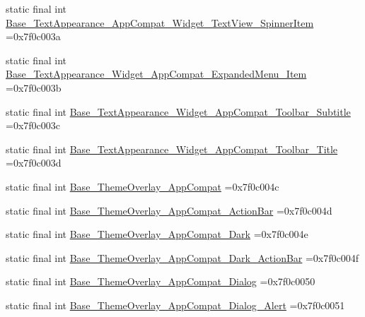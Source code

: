 \begin{DoxyCompactItemize}
\item 
static final int \mbox{\hyperlink{classbr_1_1unb_1_1cic_1_1mp_1_1marketmaster_1_1test_1_1R_1_1style_ac5f47cd9e0ef6367a47dc2f1d971d2ba}{Base\+\_\+\+Text\+Appearance\+\_\+\+App\+Compat\+\_\+\+Widget\+\_\+\+Text\+View\+\_\+\+Spinner\+Item}} =0x7f0c003a
\item 
static final int \mbox{\hyperlink{classbr_1_1unb_1_1cic_1_1mp_1_1marketmaster_1_1test_1_1R_1_1style_aa7fa7f457416be501f5bf094d8d5b4b9}{Base\+\_\+\+Text\+Appearance\+\_\+\+Widget\+\_\+\+App\+Compat\+\_\+\+Expanded\+Menu\+\_\+\+Item}} =0x7f0c003b
\item 
static final int \mbox{\hyperlink{classbr_1_1unb_1_1cic_1_1mp_1_1marketmaster_1_1test_1_1R_1_1style_a79fcc1a1e7d02b4c8cbd3c413540d922}{Base\+\_\+\+Text\+Appearance\+\_\+\+Widget\+\_\+\+App\+Compat\+\_\+\+Toolbar\+\_\+\+Subtitle}} =0x7f0c003c
\item 
static final int \mbox{\hyperlink{classbr_1_1unb_1_1cic_1_1mp_1_1marketmaster_1_1test_1_1R_1_1style_a4c5c4421297e427bdb4a616f03891e45}{Base\+\_\+\+Text\+Appearance\+\_\+\+Widget\+\_\+\+App\+Compat\+\_\+\+Toolbar\+\_\+\+Title}} =0x7f0c003d
\item 
static final int \mbox{\hyperlink{classbr_1_1unb_1_1cic_1_1mp_1_1marketmaster_1_1test_1_1R_1_1style_ac61d8932ba145853b445c490eabec8f8}{Base\+\_\+\+Theme\+Overlay\+\_\+\+App\+Compat}} =0x7f0c004c
\item 
static final int \mbox{\hyperlink{classbr_1_1unb_1_1cic_1_1mp_1_1marketmaster_1_1test_1_1R_1_1style_a3d93a78617519e758deb22ba35261cfb}{Base\+\_\+\+Theme\+Overlay\+\_\+\+App\+Compat\+\_\+\+Action\+Bar}} =0x7f0c004d
\item 
static final int \mbox{\hyperlink{classbr_1_1unb_1_1cic_1_1mp_1_1marketmaster_1_1test_1_1R_1_1style_abd8da30f93bc57ab255fe539bcf9b2e5}{Base\+\_\+\+Theme\+Overlay\+\_\+\+App\+Compat\+\_\+\+Dark}} =0x7f0c004e
\item 
static final int \mbox{\hyperlink{classbr_1_1unb_1_1cic_1_1mp_1_1marketmaster_1_1test_1_1R_1_1style_ab1bac34a3bfd1eea8851cc76b3d89c12}{Base\+\_\+\+Theme\+Overlay\+\_\+\+App\+Compat\+\_\+\+Dark\+\_\+\+Action\+Bar}} =0x7f0c004f
\item 
static final int \mbox{\hyperlink{classbr_1_1unb_1_1cic_1_1mp_1_1marketmaster_1_1test_1_1R_1_1style_a803b6d1fe24017fad52fa90d797b92df}{Base\+\_\+\+Theme\+Overlay\+\_\+\+App\+Compat\+\_\+\+Dialog}} =0x7f0c0050
\item 
static final int \mbox{\hyperlink{classbr_1_1unb_1_1cic_1_1mp_1_1marketmaster_1_1test_1_1R_1_1style_a40e350070ba9c1c2cfc5f3440c6a6d4e}{Base\+\_\+\+Theme\+Overlay\+\_\+\+App\+Compat\+\_\+\+Dialog\+\_\+\+Alert}} =0x7f0c0051

\end{DoxyCompactItemize}
